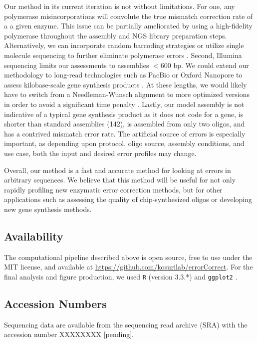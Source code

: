\documentclass[letterpaper,12pt]{article}
\begin{document}
Our method in its current iteration is not without limitations. For one, any polymerase misincorporations will convolute the true mismatch correction rate of a a given enzyme. This issue can be partially ameliorated by using a high-fidelity polymerase throughout the assembly and NGS library preparation steps. Alternatively, we can incorporate random barcoding strategies or utilize single molecule sequencing to further eliminate polymerase errors \cite{hestand2016,lee2016}. Second, Illumina sequencing limits our assessments to assemblies $<600$ bp. We could extend our methodology to long-read technologies such as PacBio or Oxford Nanopore to assess kilobase-scale gene synthesis products \cite{carson2015}. At these lengths, we would likely have to switch from a Needleman-Wunsch alignment to more optimized versions in order to avoid a significant time penalty \cite{chakraborty2013}. Lastly, our model assembly is not indicative of a typical gene synthesis product as it does not code for a gene, is shorter than standard assemblies (142), is assembled from only two oligos, and has a contrived mismatch error rate. The artificial source of errors is especially important, as depending upon protocol, oligo source, assembly conditions, and use case, both the input and desired error profiles may change.

Overall, our method is a fast and accurate method for looking at errors in arbitrary sequences. We believe that this method will be useful for not only rapidly profiling new enzymatic error correction methods, but for other applications such as assessing the quality of chip-synthesized oligos or developing new gene synthesis methods.


\subsection*{Availability}
The computational pipeline described above is open source, free to use under the MIT license, and available at \url{https://github.com/kosurilab/errorCorrect}. For the final analysis and figure production, we used \texttt{R} (version 3.3.*) and \texttt{ggplot2} \cite{R,ggplot}.

\subsection*{Accession Numbers}
Sequencing data are available from the sequencing read archive (SRA) with the accession number XXXXXXXX [pending].
\end{document}
